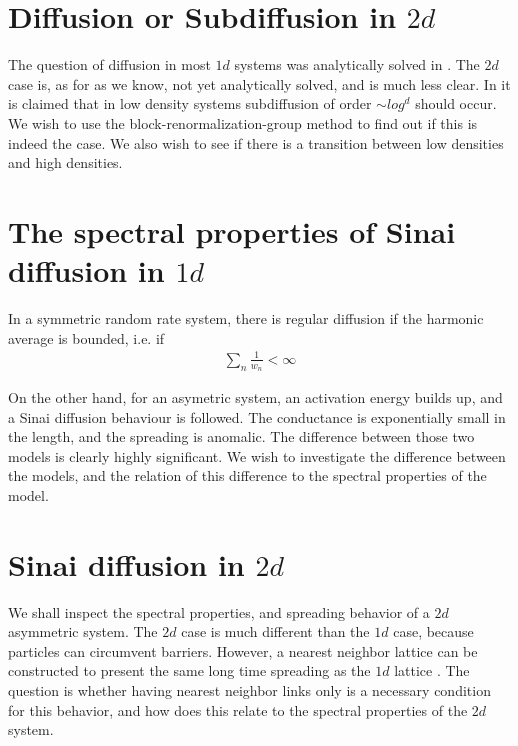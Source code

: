 \section{Diffusion or Subdiffusion in $2d$}

The question of diffusion in most $1d$ systems was analytically solved in \cite{alexander_excitation_1981}. The $2d$ case is, as for as we know, not yet analytically solved, and is much less clear. In \cite{amir_localization_2010} it is claimed that in low density systems subdiffusion of order $\sim log^d$ should occur. We wish to use the block-renormalization-group method to find out if this is indeed the case. We also wish to see if there is a transition between low densities and high densities.



\section{The spectral properties of Sinai diffusion in $1d$}

In a symmetric random rate system, there is regular diffusion if the harmonic average is bounded, i.e. if
%
\begin{align}
 \sum_n \frac{1}{w_n} < \infty 
\end{align}
%

On the other hand, for an asymetric system, an activation energy builds up, and a Sinai diffusion behaviour is followed.
The conductance is exponentially small in the length, and the spreading is anomalic. The difference between those two models is clearly highly significant. We wish to investigate the difference between the models, and the relation of this difference to the spectral properties of the model.

\section{Sinai diffusion in $2d$}

We shall inspect the spectral properties, and spreading behavior of a $2d$ asymmetric system. The
$2d$ case is much different than the $1d$ case, because particles can circumvent barriers. However,
a nearest neighbor lattice can be constructed to present the same long time spreading as the $1d$ lattice \cite{selinger_diffusion_1989}.
The question is whether having nearest neighbor links only is a necessary condition for this behavior,
and how does this relate to the spectral properties of the $2d$ system.


